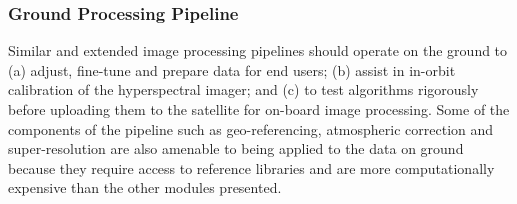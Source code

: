 \subsubsection{Ground Processing Pipeline}
Similar and extended image processing pipelines should operate on the ground to (a) adjust, fine-tune and prepare data for end users; (b) assist in in-orbit calibration of the hyperspectral imager; and (c) to test algorithms rigorously before uploading them to the satellite for on-board image processing. 
Some of the components of the pipeline such as geo-referencing, atmospheric correction and super-resolution are also amenable to being applied to the data on ground because they require access to reference libraries and are more computationally expensive than the other modules presented.

